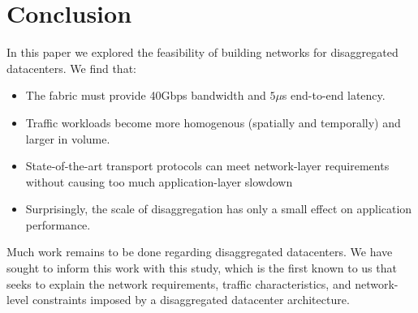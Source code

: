 \section{Conclusion}
In this paper we explored the feasibility of building networks for disaggregated datacenters. We find that: 
\begin{itemize}
\item The fabric must provide 40Gbps bandwidth and $5\mu$s end-to-end latency.
\item Traffic workloads become more homogenous (spatially and temporally) and larger in volume.
\item State-of-the-art transport protocols can meet network-layer requirements without causing too much application-layer slowdown
\item Surprisingly, the scale of disaggregation has only a small effect on application performance.
\end{itemize}
Much work remains to be done regarding disaggregated datacenters. We have sought to inform this work with this study, which is the first known to us that seeks to explain the network requirements, traffic characteristics, and network-level constraints imposed by a disaggregated datacenter architecture.